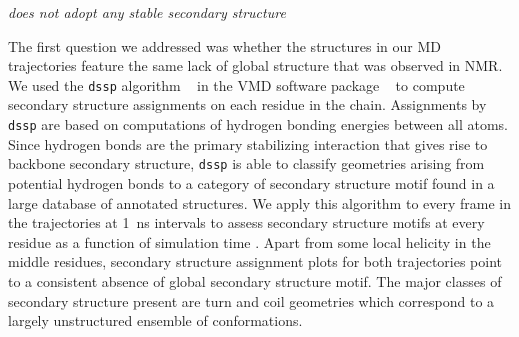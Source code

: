 {\it \gct does not adopt any stable secondary structure}

The first question we addressed was whether the structures in our MD trajectories feature the same lack of global structure that was observed in NMR. We used the \texttt{dssp} algorithm ~\cite{kabsch1983dictionary} in the VMD software package ~\cite{humphrey1996vmd} to compute secondary structure assignments on each residue in the chain. Assignments by \texttt{dssp} are based on computations of hydrogen bonding energies between all atoms. Since hydrogen bonds are the primary stabilizing interaction that gives rise to backbone secondary structure, \texttt{dssp} is able to classify geometries arising from potential hydrogen bonds to a category of secondary structure motif found in a large database of annotated structures. We apply this algorithm to every frame in the trajectories at \SI{1}{\ns} intervals to assess secondary structure motifs at every residue as a function of simulation time . Apart from some local helicity in the middle residues, secondary structure assignment plots for both trajectories point to a consistent absence of global secondary structure motif. The major classes of secondary structure present are turn and coil geometries which correspond to a largely unstructured ensemble of conformations. 

\begin{figure}
	\centering     %
	\subfigure[WT]{\label{fig:ss_a}\texttt{[image: wt\_ss]}}
	\subfigure[YD]{\label{fig:ss_b}\texttt{[image: yd\_ss]}}
	\label{fig:ss}
\end{figure}	


